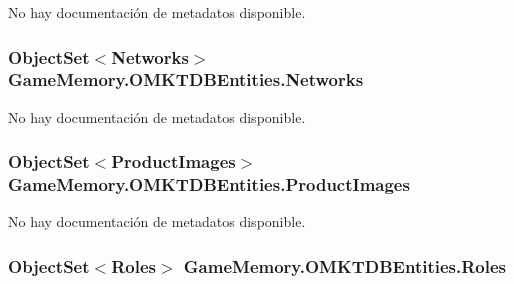 No hay documentación de metadatos disponible. 

\hypertarget{class_game_memory_1_1_o_m_k_t_d_b_entities_ac362cc17f97a3d750ba0b99718919634}{
\subsubsection[{Networks}]{\setlength{\rightskip}{0pt plus 5cm}Object\-Set$<${\bf Networks}$>$ Game\-Memory.\-O\-M\-K\-T\-D\-B\-Entities.\-Networks\hspace{0.3cm}{\ttfamily [get]}}}\label{class_game_memory_1_1_o_m_k_t_d_b_entities_ac362cc17f97a3d750ba0b99718919634}


No hay documentación de metadatos disponible. 

\hypertarget{class_game_memory_1_1_o_m_k_t_d_b_entities_a5737285ce03f1aa6de7115c37bd4eb1d}{
\subsubsection[{Product\-Images}]{\setlength{\rightskip}{0pt plus 5cm}Object\-Set$<${\bf Product\-Images}$>$ Game\-Memory.\-O\-M\-K\-T\-D\-B\-Entities.\-Product\-Images\hspace{0.3cm}{\ttfamily [get]}}}\label{class_game_memory_1_1_o_m_k_t_d_b_entities_a5737285ce03f1aa6de7115c37bd4eb1d}


No hay documentación de metadatos disponible. 

\hypertarget{class_game_memory_1_1_o_m_k_t_d_b_entities_a8e51c314561a34101d9e8c76341e9b81}{
\subsubsection[{Roles}]{\setlength{\rightskip}{0pt plus 5cm}Object\-Set$<${\bf Roles}$>$ Game\-Memory.\-O\-M\-K\-T\-D\-B\-Entities.\-Roles\hspace{0.3cm}{\ttfamily [get]}}}\label{class_game_memory_1_1_o_m_k_t_d_b_entities_a8e51c314561a34101d9e8c76341e9b81}



